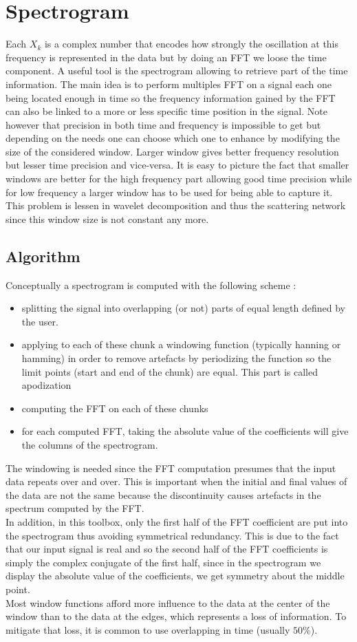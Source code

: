 \documentclass[a4paper]{report}
\begin{document}
\chapter{Spectrogram}
Each $X_k$ is a complex number that encodes how strongly the oscillation at this frequency is represented in the data but by doing an FFT we loose the time component. A useful tool is the spectrogram allowing to retrieve part of the time information. The main idea is to perform multiples FFT on a signal each one being located enough in time so the frequency information gained by the FFT can also be linked to a more or less specific time position in the signal. Note however that precision in both time and frequency is impossible to get but depending on the needs one can choose which one to enhance by modifying the size of the considered window. Larger window gives better frequency resolution but lesser time precision and vice-versa. It is easy to picture the fact that smaller windows are better for the high frequency part allowing good time precision while for low frequency a larger window has to be used for being able to capture it. This problem is lessen in wavelet decomposition and thus the scattering network since this window size is not constant any more.
\section{Algorithm}
Conceptually a spectrogram is computed with the following scheme : 
\begin{itemize}
\item splitting the signal into overlapping (or not) parts of equal length defined by the user.
\item applying to each of these chunk a windowing function (typically hanning or hamming) in order to remove artefacts by periodizing the function so the limit points (start and end of the chunk) are equal. This part is called apodization
\item computing the FFT on each of these chunks
\item for each computed FFT, taking the absolute value of the coefficients will give the columns of the spectrogram.

\end{itemize}
The windowing is needed since the FFT computation presumes that the input data repeats over and over. This is important when the initial and final values of the data are not the same because the discontinuity causes artefacts in the spectrum computed by the FFT.
\\
In addition, in this toolbox, only the first half of the FFT coefficient are put into the spectrogram thus avoiding symmetrical redundancy. This is due to the fact that our input signal is real and so the second half of the FFT coefficients is simply the complex conjugate of the first half, since in the spectrogram we display the absolute value of the coefficients, we get symmetry about the middle point.
\\ 
Most window functions afford more influence to the data at the center of the window than to the data at the edges, which represents a loss of information. To mitigate that loss, it is common to use overlapping in time (usually $50\%$).
\end{document}
